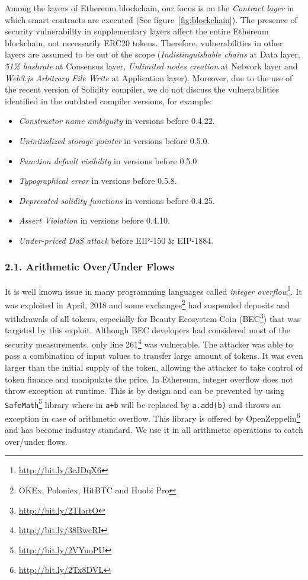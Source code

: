 Among the layers of Ethereum blockchain, our focus is on the \textit{Contract layer} in which smart contracts are executed (See figure~\ref{fig:blockchain}). The presence of security vulnerability in supplementary layers affect the entire Ethereum blockchain, not necessarily ERC20 tokens. Therefore, vulnerabilities in other layers are assumed to be out of the scope (\eg \textit{Indistinguishable chains} at Data layer, \textit{51\% hashrate} at Consensus layer, \textit{Unlimited nodes creation} at Network layer and \textit{Web3.js Arbitrary File Write} at Application layer). Moreover, due to the use of the recent version of Solidity compiler, we do not discuss the vulnerabilities identified in the outdated compiler versions, for example:
\begin{itemize}
	\item \textit{Constructor name ambiguity} in versions before 0.4.22.
	\item \textit{Uninitialized storage pointer} in versions before 0.5.0.
	\item \textit{Function default visibility} in versions before 0.5.0
	\item \textit{Typographical error} in versions before 0.5.8.
	\item \textit{Deprecated solidity functions} in versions before 0.4.25.
	\item \textit{Assert Violation} in versions before 0.4.10.
	\item \textit{Under-priced DoS attack} before EIP-150 \& EIP-1884.
\end{itemize}

\subsubsection*{2.1. Arithmetic Over/Under Flows}
It is well known issue in many programming languages called \textit{integer overflow}\footnote{\url{http://bit.ly/3cJDqX6}}. It was exploited in April, 2018 and some exchanges\footnote{OKEx, Poloniex, HitBTC and Huobi Pro} had suspended deposits and withdrawals of all tokens, especially for Beauty Ecosystem Coin (BEC\footnote{\url{http://bit.ly/2TIartO}}) that was targeted by this exploit. Although BEC developers had considered most of the security measurements, only line 261\footnote{\url{http://bit.ly/38BwcRI}} was vulnerable\cite{PeckShield}. The attacker was able to pass a combination of input values to transfer large amount of tokens\cite{Overflow}. It was even larger than the initial supply of the token, allowing the attacker to take control of token finance and manipulate the price. In Ethereum, integer overflow does not throw exception at runtime. This is by design and can be prevented by using \texttt{SafeMath}\footnote{\url{http://bit.ly/2VYuoPU}} library where in \texttt{a+b} will be replaced by \texttt{a.add(b)} and throws an exception in case of arithmetic overflow. This library is offered by OpenZeppelin\footnote{\url{http://bit.ly/2Tx8DVL}} and has become industry standard. We use it in all arithmetic operations to catch over/under flows.

